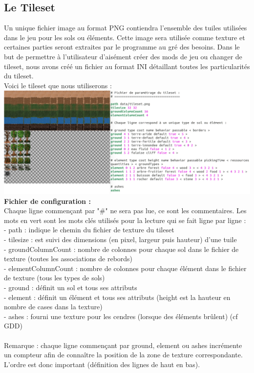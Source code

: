 \documentclass[a4paper]{article}
\newcommand{\alinea}{\hspace*{0.5cm}}
\begin{document}
      \subsection{Le Tileset}
		\label{TilesetDev}
		\alinea Un unique fichier image au format PNG contiendra l'ensemble des tuiles utilisées dans le jeu pour les sols ou éléments. Cette image sera utilisée comme texture et certaines parties seront extraites par le programme au gré des besoins.
		\alinea Dans le but de permettre à l'utilisateur d'aisément créer des mods de jeu ou changer de tileset, nous avons créé un fichier au format INI détaillant toutes les particularités du tileset.\\
		\alinea Voici le tileset que nous utiliserons :\\
        \includegraphics[scale=0.35]{img/TilesetPngIni.png}
        \label{TilesetPngIni}
        \\
        \textbf{Fichier de configuration :}\\
        \alinea Chaque ligne commençant par "\#" ne sera pas lue, ce sont les commentaires. Les mots en vert sont les mots clés utilisés pour la lecture qui se fait ligne par ligne :\\
        - path : indique le chemin du fichier de texture du tileset\\
        - tilesize : est suivi des dimensions (en pixel, largeur puis hauteur) d'une tuile\\
        - groundColumnCount : nombre de colonnes pour chaque sol dans le fichier de texture (toutes les associations de rebords)\\
        - elementColumnCount : nombre de colonnes pour chaque élément dans le fichier de texture (tous les types de sols)\\
        - ground : définit un sol et tous ses attributs\\
        - element : définit un élément et tous ses attributs (height est la hauteur en nombre de cases dans la texture)\\
        - ashes : fourni une texture pour les cendres (lorsque des éléments brûlent) (cf GDD)\\
        \\
        Remarque : chaque ligne commençant par ground, element ou ashes incrémente un compteur afin de connaître la position de la zone de texture correspondante. L'ordre est donc important (définition des lignes de haut en bas).
\end{document}
